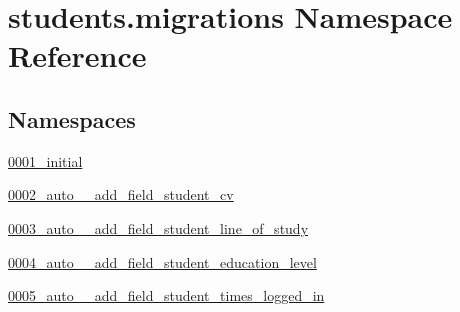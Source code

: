 \hypertarget{namespacestudents_1_1migrations}{\section{students.\-migrations Namespace Reference}
\label{namespacestudents_1_1migrations}
}
\subsection*{Namespaces}
\begin{DoxyCompactItemize}
\item 
\hyperlink{namespacestudents_1_1migrations_1_10001__initial}{0001\-\_\-initial}
\item 
\hyperlink{namespacestudents_1_1migrations_1_10002__auto____add__field__student__cv}{0002\-\_\-auto\-\_\-\-\_\-add\-\_\-field\-\_\-student\-\_\-cv}
\item 
\hyperlink{namespacestudents_1_1migrations_1_10003__auto____add__field__student__line__of__study}{0003\-\_\-auto\-\_\-\-\_\-add\-\_\-field\-\_\-student\-\_\-line\-\_\-of\-\_\-study}
\item 
\hyperlink{namespacestudents_1_1migrations_1_10004__auto____add__field__student__education__level}{0004\-\_\-auto\-\_\-\-\_\-add\-\_\-field\-\_\-student\-\_\-education\-\_\-level}
\item 
\hyperlink{namespacestudents_1_1migrations_1_10005__auto____add__field__student__times__logged__in}{0005\-\_\-auto\-\_\-\-\_\-add\-\_\-field\-\_\-student\-\_\-times\-\_\-logged\-\_\-in}
\end{DoxyCompactItemize}
